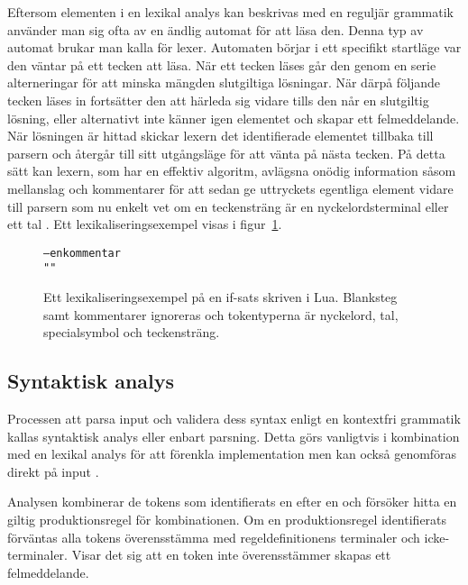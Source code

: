 Eftersom elementen i en lexikal analys kan beskrivas med en reguljär grammatik
använder man sig ofta av en ändlig automat för att läsa den. Denna typ av
automat brukar man kalla för lexer. Automaten börjar i ett specifikt startläge
var den väntar på ett tecken att läsa. När ett tecken läses går den genom en
serie alterneringar för att minska mängden slutgiltiga lösningar. När därpå
följande tecken läses in fortsätter den att härleda sig vidare tills den når
en slutgiltig lösning, eller alternativt inte känner igen elementet och skapar
ett felmeddelande. När lösningen är hittad skickar lexern det identifierade
elementet tillbaka till parsern och återgår till sitt utgångsläge för att
vänta på nästa tecken.  På detta sätt kan lexern, som har en effektiv
algoritm, avlägsna onödig information såsom mellanslag och kommentarer för att
sedan ge uttryckets egentliga element vidare till parsern som nu enkelt vet om
en teckensträng är en nyckelordsterminal eller ett tal \citep[s.  51]{sm09}.
Ett lexikaliseringsexempel visas i figur~\ref{fig:lexing}.

\begin{figure}[ht]
  \begin{alltt}
  \boxpunct{+}  \boxpunct{>}  \boxpunct{==}  
  -- en kommentar
   ""\boxpunct{;}
  \end{alltt}
  \caption{Ett lexikaliseringsexempel på en if-sats skriven i Lua.
    Blanksteg samt kommentarer ignoreras och tokentyperna är nyckelord, tal,
    specialsymbol och teckensträng.} \label{fig:yacc}
  \label{fig:lexing}
\end{figure}

\subsection{Syntaktisk analys}

Processen att parsa input och validera dess syntax enligt en kontextfri
grammatik kallas syntaktisk analys eller enbart parsning. Detta görs
vanligtvis i kombination med en lexikal analys för att förenkla
implementation men kan också genomföras direkt på input \citep[s. 8]{aa06}.

Analysen kombinerar de tokens som identifierats en efter en och försöker hitta
en giltig produktionsregel för kombinationen. Om en produktionsregel
identifierats förväntas alla tokens överensstämma med regeldefinitionens
terminaler och icke-terminaler. Visar det sig att en token inte överensstämmer
skapas ett felmeddelande.

